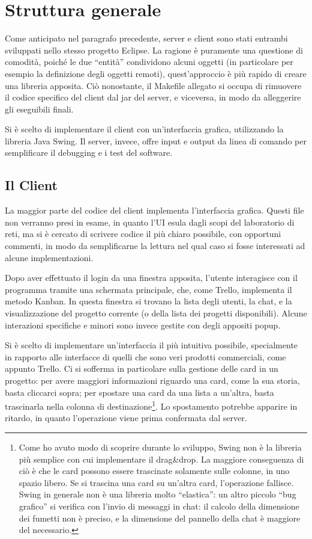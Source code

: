 \documentclass[a4paper,11pt] {article}
\begin{document}
\section*{Struttura generale}

Come anticipato nel paragrafo precedente, server e client sono stati entrambi sviluppati nello stesso progetto Eclipse. La ragione è puramente una questione di comodità, poiché le due ``entità'' condividono alcuni oggetti (in particolare per esempio la definizione degli oggetti remoti), quest'approccio è più rapido di creare una libreria apposita. Ciò nonostante, il Makefile allegato si occupa di rimuovere il codice specifico del client dal jar del server, e viceversa, in modo da alleggerire gli eseguibili finali.

Si è scelto di implementare il client con un'interfaccia grafica, utilizzando la libreria Java Swing. Il server, invece, offre input e output da linea di comando per semplificare il debugging e i test del software.

\subsection*{Il Client}

La maggior parte del codice del client implementa l'interfaccia grafica. Questi file non verranno presi in esame, in quanto l'UI esula dagli scopi del laboratorio di reti, ma si è cercato di scrivere codice il più chiaro possibile, con opportuni commenti, in modo da semplificarne la lettura nel qual caso si fosse interessati ad alcune implementazioni.

Dopo aver effettuato il login da una finestra apposita, l'utente interagisce con il programma tramite una schermata principale, che, come Trello, implementa il metodo Kanban. In questa finestra si trovano la lista degli utenti, la chat, e la visualizzazione del progetto corrente (o della lista dei progetti disponibili). Alcune interazioni specifiche e minori sono invece gestite con degli appositi popup.

Si è scelto di implementare un'interfaccia il più intuitiva possibile, specialmente in rapporto alle interfacce di quelli che sono veri prodotti commerciali, come appunto Trello. Ci si sofferma in particolare sulla gestione delle card in un progetto: per avere maggiori informazioni riguardo una card, come la sua storia, basta cliccarci sopra; per spostare una card da una lista a un'altra, basta trascinarla nella colonna di destinazione\footnote{Come ho avuto modo di scoprire durante lo sviluppo, Swing non è la libreria più semplice con cui implementare il drag\&drop. La maggiore conseguenza di ciò è che le card possono essere trascinate solamente sulle colonne, in uno spazio libero. Se si trascina una card su un'altra card, l'operazione fallisce.\\Swing in generale non è una libreria molto ``elastica'': un altro piccolo ``bug grafico'' si verifica con l'invio di messaggi in chat: il calcolo della dimensione dei fumetti non è preciso, e la dimensione del pannello della chat è maggiore del necessario.}. Lo spostamento potrebbe apparire in ritardo, in quanto l'operazione viene prima confermata dal server.
\end{document}
